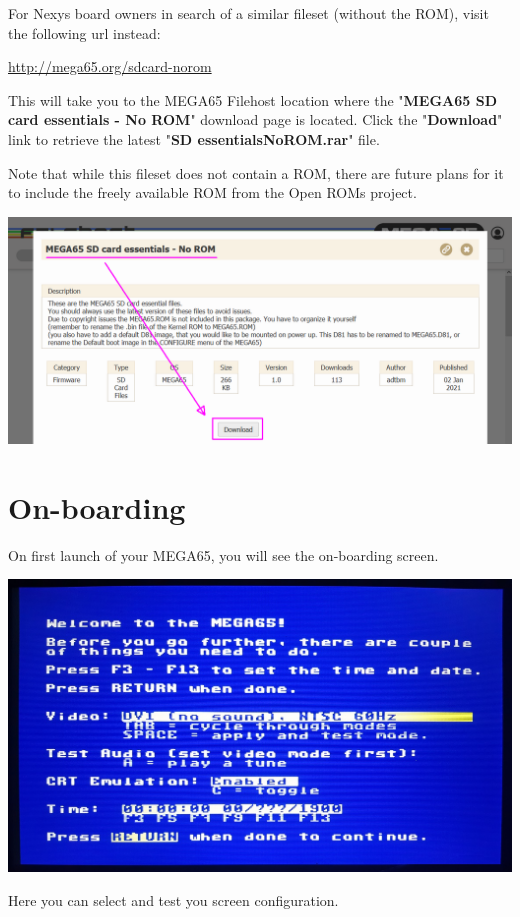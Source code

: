 For Nexys board owners in search of a similar fileset (without the ROM), visit the following url instead:

\url{http://mega65.org/sdcard-norom}

This will take you to the MEGA65 Filehost location where the "\textbf{MEGA65 SD card essentials - No ROM}" download page is located. Click the "\textbf{Download}" link to retrieve the latest "\textbf{SD essentialsNoROM.rar}" file.

Note that while this fileset does not contain a ROM, there are future plans for it to include the freely available ROM from the Open ROMs project.

\includegraphics[width=\linewidth]{images/latest_support_files.png}

\label{onboarding}
\section{On-boarding}

On first launch of your MEGA65, you will see the on-boarding screen.

\begin{center}
  \includegraphics[trim= 10mm 10mm 10mm 10mm,clip,width=0.7\linewidth]{images/img011_final_boot_01.jpg}
\end{center}

Here you can select and test you screen configuration.

